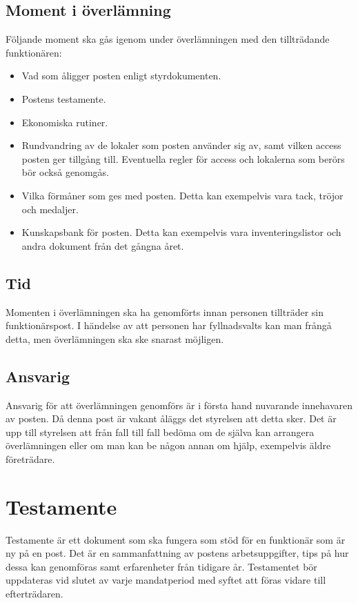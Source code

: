 \documentclass[]{dsekprotokoll}
\begin{document}
\subsection{Moment i överlämning}
Följande moment ska gås igenom under överlämningen med den tillträdande funktionären:
\begin{itemize}
    \item Vad som åligger posten enligt styrdokumenten.
    \item Postens testamente.
    \item Ekonomiska rutiner.
    \item Rundvandring av de lokaler som posten använder sig av, samt vilken access posten ger tillgång till. Eventuella regler för access och lokalerna som berörs bör också genomgås.
    \item Vilka förmåner som ges med posten. Detta kan exempelvis vara tack, tröjor och medaljer.
    \item Kunskapsbank för posten. Detta kan exempelvis vara inventeringslistor och andra dokument från det gångna året.
\end{itemize}
\subsection{Tid}
Momenten i överlämningen ska ha genomförts innan personen tillträder sin funktionärspost. I händelse av att personen har fyllnadsvalts kan man frångå detta, men överlämningen ska ske snarast möjligen.

\subsection{Ansvarig}
Ansvarig för att överlämningen genomförs är i första hand nuvarande innehavaren av posten. Då denna post är vakant åläggs det styrelsen att detta sker. Det är upp till styrelsen att från fall till fall bedöma om de själva kan arrangera överlämningen eller om man kan be någon annan om hjälp, exempelvis äldre företrädare.

\section{Testamente}
Testamente är ett dokument som ska fungera som stöd för en funktionär som är ny på en post. Det är en sammanfattning av postens arbetsuppgifter, tips på hur dessa kan genomföras samt erfarenheter från tidigare år. Testamentet bör uppdateras vid slutet av varje mandatperiod med syftet att föras vidare till efterträdaren.
\end{document}
